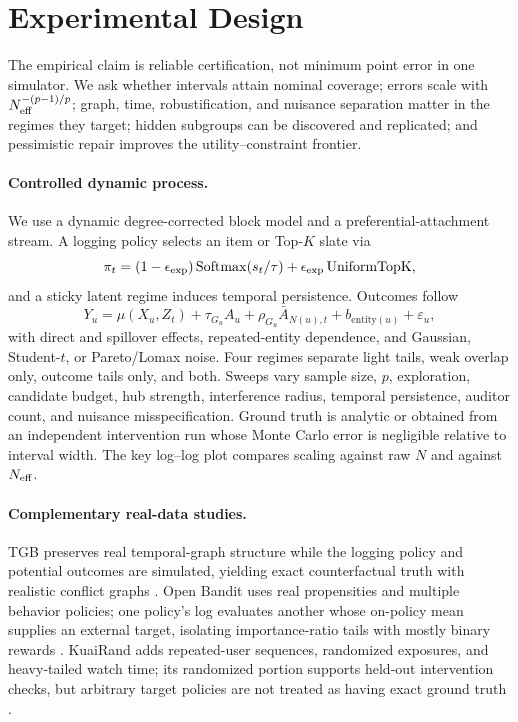 \section{Experimental Design}
\label{sec:experiments}

The empirical claim is reliable certification, not minimum point error in one simulator. We ask whether intervals attain nominal coverage; errors scale with $N_{\mathrm{eff}}^{-(p-1)/p}$; graph, time, robustification, and nuisance separation matter in the regimes they target; hidden subgroups can be discovered and replicated; and pessimistic repair improves the utility--constraint frontier.

\paragraph{Controlled dynamic process.}
We use a dynamic degree-corrected block model and a preferential-attachment stream. A logging policy selects an item or Top-$K$ slate via
\begin{equation}
\pi_t=(1-\epsilon_{\rm exp})\operatorname{Softmax}(s_t/\tau)
+\epsilon_{\rm exp}\operatorname{UniformTopK},
\label{eq:synthetic-policy}
\end{equation}
and a sticky latent regime induces temporal persistence. Outcomes follow
\begin{equation}
Y_u=\mu(X_u,Z_t)+\tau_{G_u}A_u+\rho_{G_u}\bar A_{N(u),t}
+b_{\mathrm{entity}(u)}+\varepsilon_u,
\label{eq:synthetic-outcome}
\end{equation}
with direct and spillover effects, repeated-entity dependence, and Gaussian, Student-$t$, or Pareto/Lomax noise. Four regimes separate light tails, weak overlap only, outcome tails only, and both. Sweeps vary sample size, $p$, exploration, candidate budget, hub strength, interference radius, temporal persistence, auditor count, and nuisance misspecification. Ground truth is analytic or obtained from an independent intervention run whose Monte Carlo error is negligible relative to interval width. The key log--log plot compares scaling against raw $N$ and against $N_{\mathrm{eff}}$.

\paragraph{Complementary real-data studies.}
TGB preserves real temporal-graph structure while the logging policy and potential outcomes are simulated, yielding exact counterfactual truth with realistic conflict graphs \citep{huang2023tgb}. Open Bandit uses real propensities and multiple behavior policies; one policy's log evaluates another whose on-policy mean supplies an external target, isolating importance-ratio tails with mostly binary rewards \citep{saito2021open}. KuaiRand adds repeated-user sequences, randomized exposures, and heavy-tailed watch time; its randomized portion supports held-out intervention checks, but arbitrary target policies are not treated as having exact ground truth \citep{gao2022kuairand}.

